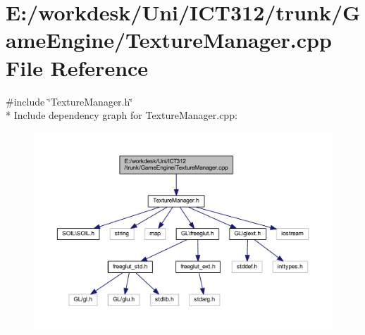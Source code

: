 \section{E\+:/workdesk/\+Uni/\+I\+C\+T312/trunk/\+Game\+Engine/\+Texture\+Manager.cpp File Reference}
\label{_texture_manager_8cpp}
{\ttfamily \#include \char`\"{}Texture\+Manager.\+h\char`\"{}}\\*
Include dependency graph for Texture\+Manager.\+cpp\+:\nopagebreak
\begin{figure}[H]
\begin{center}
\leavevmode
\includegraphics[width=350pt]{da/dbb/_texture_manager_8cpp__incl}
\end{center}
\end{figure}
